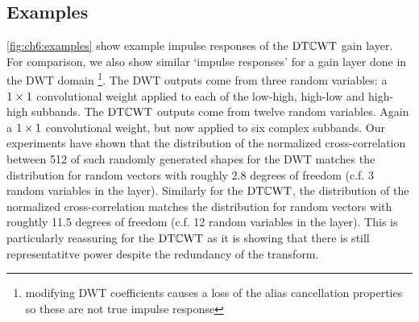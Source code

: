 \begin{figure}[t!]
  \centering
  \resizebox{\textwidth}{!}{}
  \label{fig:ch6:dtcwt_blk_diagram}
  \label{fig:ch6:block_diagrams}
\end{figure}

\subsection{Examples}
\autoref{fig:ch6:examples} show example impulse responses of the $\mathrm{DT}\mathbb{C}\mathrm{WT}$ gain
layer. For comparison, we also show similar `impulse responses' for a gain layer
done in the DWT domain \footnote{modifying DWT coefficients causes a loss of the
alias cancellation properties so these are not true impulse response}. The DWT 
outputs come from three random variables: a $1\times 1$ 
convolutional weight applied to each of the low-high, high-low and high-high
subbands. The $\mathrm{DT}\mathbb{C}\mathrm{WT}$ outputs come from twelve random variables. Again a $1\times
1$ convolutional weight, but now applied to six complex subbands. 
Our experiments have shown that the distribution of the normalized
cross-correlation between 512 of such randomly generated shapes for the DWT matches the
distribution for random vectors with roughly 2.8 degrees of freedom (c.f. 3
random variables in the layer). Similarly for the $\mathrm{DT}\mathbb{C}\mathrm{WT}$, the distribution of
the normalized cross-correlation matches the distribution for random vectors
with roughtly 11.5 degrees of freedom (c.f. 12 random variables in the layer).
This is particularly reassuring for the $\mathrm{DT}\mathbb{C}\mathrm{WT}$ as it is showing that there is
still representatitve power despite the redundancy of the transform.

